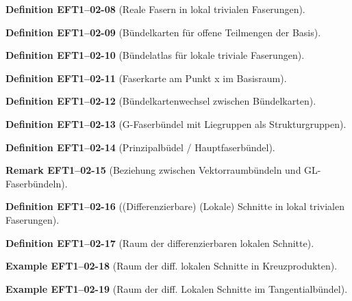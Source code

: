 \documentclass[10pt, letterpaper]{article}
\newcommand{\CustomHeading}[3]{%
  \par\medskip\noindent%
  \textbf{#1 #2} \textnormal{(#3)}.\enskip%
}
\newenvironment{DEF}[2]{\CustomHeading{Definition}{#1}{#2}}{}
\newenvironment{REM}[2]{\CustomHeading{Remark}{#1}{#2}}{}
\newenvironment{EXA}[2]{\CustomHeading{Example}{#1}{#2}}{}
\begin{document}
\begin{DEF}{EFT1--02-08}{Reale Fasern in lokal trivialen Faserungen}
\end{DEF}

\begin{DEF}{EFT1--02-09}{Bündelkarten für offene Teilmengen der Basis}
\end{DEF}

\begin{DEF}{EFT1--02-10}{Bündelatlas für lokale triviale Faserungen}
\end{DEF}

\begin{DEF}{EFT1--02-11}{Faserkarte am Punkt x im Basisraum}
\end{DEF}

\begin{DEF}{EFT1--02-12}{Bündelkartenwechsel zwischen Bündelkarten}
\end{DEF}

\begin{DEF}{EFT1--02-13}{G-Faserbündel mit Liegruppen als Strukturgruppen}
\end{DEF}

\begin{DEF}{EFT1--02-14}{Prinzipalbüdel / Hauptfaserbündel}
\end{DEF}

\begin{REM}{EFT1--02-15}{Beziehung zwischen Vektorraumbündeln und GL-Faserbündeln}
\end{REM}

\begin{DEF}{EFT1--02-16}{(Differenzierbare) (Lokale) Schnitte in lokal trivialen Faserungen}
\end{DEF}

\begin{DEF}{EFT1--02-17}{Raum der differenzierbaren lokalen Schnitte}
\end{DEF}

\begin{EXA}{EFT1--02-18}{Raum der diff. lokalen Schnitte in Kreuzprodukten}
\end{EXA}

\begin{EXA}{EFT1--02-19}{Raum der diff. Lokalen Schnitte im Tangentialbündel}
\end{EXA}
\end{document}
